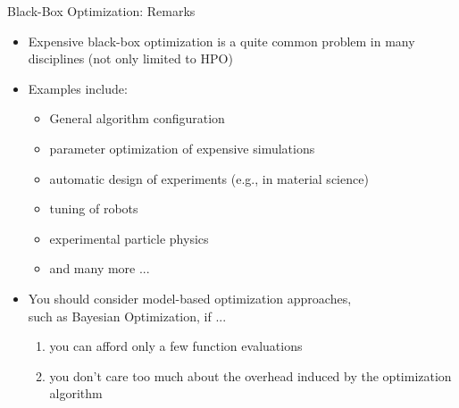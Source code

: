 \begin{frame}[c,fragile]{Black-Box Optimization: Remarks}

\begin{itemize}
	\item Expensive black-box optimization is a quite common problem in many disciplines 
	(not only limited to HPO)
	\item Examples include:
	\begin{itemize}
		\item General algorithm configuration
		\item parameter optimization of expensive simulations
		\item automatic design of experiments (e.g., in material science)
		\item tuning of robots
		\item experimental particle physics
		\item and many more ...
	\end{itemize}
	\medskip
	\pause
	\item You should consider model-based optimization approaches,\\ such as Bayesian Optimization, if ...
	\begin{enumerate}
		\item you can afford only a few function evaluations
		\item you don't care too much about the overhead induced by the optimization algorithm
	\end{enumerate}
\end{itemize}

\end{frame}
